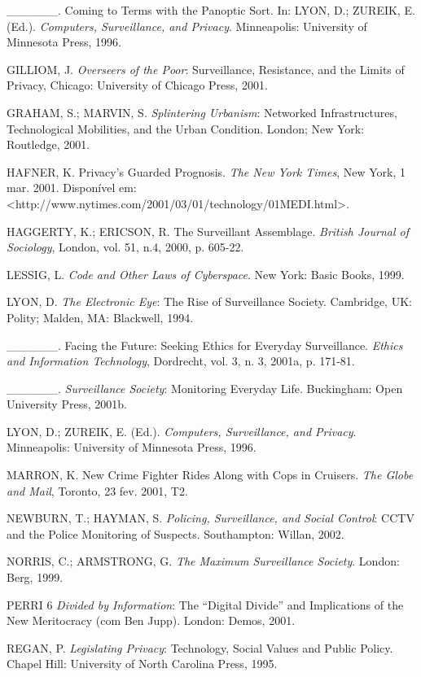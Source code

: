 \_\_\_\_\_\_. Coming to Terms with the Panoptic Sort. In: LYON, D.;
ZUREIK, E. (Ed.). \emph{Computers, Surveillance, and Privacy}.
Minneapolis: University of Minnesota Press, 1996.

GILLIOM, J. \emph{Overseers of the Poor}: Surveillance, Resistance, and
the Limits of Privacy, Chicago: University of Chicago Press, 2001.

GRAHAM, S.; MARVIN, S. \emph{Splintering Urbanism}: Networked
Infrastructures, Technological Mobilities, and the Urban Condition.
London; New York: Routledge, 2001.

HAFNER, K. Privacy's Guarded Prognosis. \emph{The New York Times}, New
York, 1 mar. 2001. Disponível em:
\textless{}http://www.nytimes.com/2001/03/01/technology/01MEDI.html\textgreater{}.

HAGGERTY, K.; ERICSON, R. The Surveillant Assemblage. \emph{British
Journal of Sociology}, London, vol. 51, n.4, 2000, p. 605-22.

LESSIG, L. \emph{Code and Other Laws of Cyberspace}. New York: Basic
Books, 1999.

LYON, D. \emph{The Electronic Eye}: The Rise of Surveillance Society.
Cambridge, UK: Polity; Malden, MA: Blackwell, 1994.

\_\_\_\_\_\_. Facing the Future: Seeking Ethics for Everyday
Surveillance. \emph{Ethics and Information Technology}, Dordrecht, vol.
3, n. 3, 2001a, p. 171-81.

\_\_\_\_\_\_. \emph{Surveillance Society}: Monitoring Everyday Life.
Buckingham: Open University Press, 2001b.

LYON, D.; ZUREIK, E. (Ed.). \emph{Computers, Surveillance, and Privacy}.
Minneapolis: University of Minnesota Press, 1996.

MARRON, K. New Crime Fighter Rides Along with Cops in Cruisers.
\emph{The Globe and Mail}, Toronto, 23 fev. 2001, T2.

NEWBURN, T.; HAYMAN, S. \emph{Policing, Surveillance, and Social
Control}: CCTV and the Police Monitoring of Suspects. Southampton:
Willan, 2002.

NORRIS, C.; ARMSTRONG, G. \emph{The Maximum Surveillance Society}.
London: Berg, 1999.

PERRI 6 \emph{Divided by Information}: The ``Digital Divide'' and
Implications of the New Meritocracy (com Ben Jupp). London: Demos, 2001.

REGAN, P. \emph{Legislating Privacy}: Technology, Social Values and
Public Policy. Chapel Hill: University of North Carolina Press, 1995.

